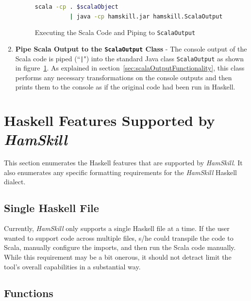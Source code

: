 \documentclass{report}
\begin{document}
\begin{enumerate}
\begin{figure}[H]
\begin{mdframed}
\begin{lstlisting}[language=bash]
scala -cp . $scalaObject 
          | java -cp hamskill.jar hamskill.ScalaOutput
\end{lstlisting}
\end{mdframed}
\caption{Executing the Scala Code and Piping to \texttt{ScalaOutput}}\label{fig:runScalaAndConvertOutput}
\end{figure}

\item \textbf{Pipe Scala Output to the \texttt{ScalaOutput} Class} - The console output of the Scala code is piped (``\texttt{|}") into the standard Java class \texttt{ScalaOutput} as shown in figure~\ref{fig:runScalaAndConvertOutput}.  As explained in section~\ref{sec:scalaOutputFunctionality}, this class performs any necessary transformations on the console outputs and then prints them to the console as if the original code had been run in Haskell.

\end{enumerate} 

\section{Haskell Features Supported by \textit{HamSkill}}\label{sec:hamskillFeatures}

This section enumerates the Haskell features that are supported by \textit{HamSkill}.  It also enumerates any specific formatting requirements for the \textit{HamSkill} Haskell dialect.

\subsection{Single Haskell File}

Currently, \textit{HamSkill} only supports a single Haskell file at a time.  If the user wanted to support code across multiple files, s/he could transpile the code to Scala, manually configure the imports, and then run the Scala code manually.  While this requirement may be a bit onerous, it should not detract limit the tool's overall capabilities in a substantial way.

\subsection{Functions}
\end{document}
